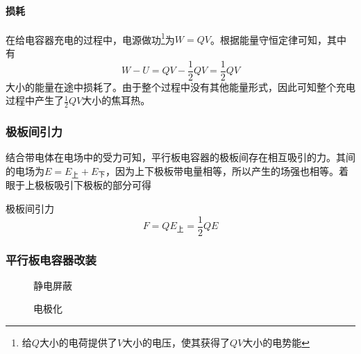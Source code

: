 \paragraph{损耗}在给电容器充电的过程中，电源做功\footnote{给$Q$大小的电荷提供了$V$大小的电压，使其获得了$QV$大小的电势能}为$W=QV$。根据能量守恒定律可知，其中有
\begin{equation*}
    W-U=QV-\frac12QV=\frac12QV
\end{equation*}
大小的能量在途中损耗了。由于整个过程中没有其他能量形式，因此可知整个充电过程中产生了$\frac12QV$大小的焦耳热。

\subsubsection{极板间引力}

结合带电体在电场中的受力可知，平行板电容器的极板间存在相互吸引的力。其间的电场为$E=E_\textrm{上}+E_\textrm{下}$，因为上下极板带电量相等，所以产生的场强也相等。着眼于上极板吸引下极板的部分可得
\begin{itembox}[l]{极板间引力}
    \begin{equation*}
        F=QE_\textrm{上}=\frac12QE
    \end{equation*}
\end{itembox}

\subsubsection{平行板电容器改装}

\begin{figure}[ht!]
    \centering
    \begin{minipage}[t]{0.48\textwidth}
        \centering
        \caption{静电屏蔽}
    \end{minipage}
    \begin{minipage}[t]{0.48\textwidth}
        \centering
        \caption{电极化}
    \end{minipage}
\end{figure}

